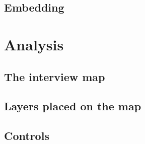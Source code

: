 \subsection{Embedding}
\label{subsec:embedding}

\section{Analysis}
\label{sec:analysis}

\subsection{The interview map}
\label{subsec:interview_map}

\subsection{Layers placed on the map}
\label{subsec:layers}

\subsection{Controls}
\label{subsec:controls}
